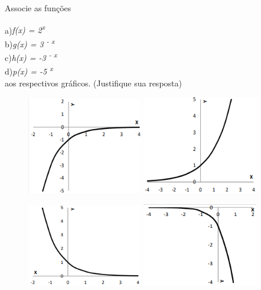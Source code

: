 \begin{texemplo}
Associe as funções 

a)\textit{f(x) = 2\textsuperscript{x}}\\ 
b)\textit{g(x) = 3\textsuperscript{ - x}}\\
c)\textit{h(x) = -3\textsuperscript{ - x}}\\
d)\textit{p(x) = -5 \textsuperscript{x}}\\

aos respectivos gráficos. (Justifique sua resposta)

\begin{figure}[H]
    \includegraphics[width=0.45\textwidth]{capitulos/potencias_e_funcoes_exponenciais/media/image11.png} 
    \includegraphics[width=0.45\textwidth]{capitulos/potencias_e_funcoes_exponenciais/media/image12.png}
\end{figure}

\begin{figure}[H]
    \includegraphics[width=0.45\textwidth]{capitulos/potencias_e_funcoes_exponenciais/media/image13.png} 
    \includegraphics[width=0.45\textwidth]{capitulos/potencias_e_funcoes_exponenciais/media/image14.png}
\end{figure}


\end{texemplo}
